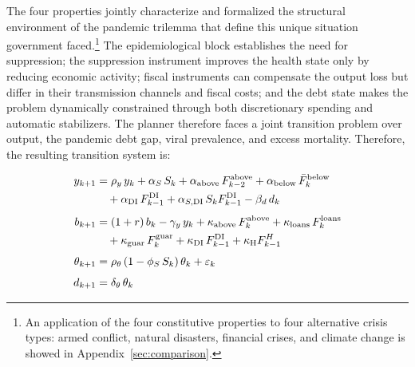 \documentclass[12pt, a4paper]{article}
\begin{document}

\vspace{5mm}
\noindent The four properties jointly characterize and formalized the structural environment of the pandemic trilemma that define this unique situation government faced.\footnote{An application of the four constitutive properties to four alternative crisis types: armed conflict, natural disasters, financial crises, and climate change is showed in Appendix~\ref{sec:comparison}.} The epidemiological block establishes the need for suppression; the suppression instrument improves the health state only by reducing economic activity; fiscal instruments can compensate the output loss but differ in their transmission channels and fiscal costs; and the debt state makes the problem dynamically constrained through both discretionary spending and automatic stabilizers. The planner therefore faces a joint transition problem over output, the pandemic debt gap, viral prevalence, and excess mortality. Therefore, the resulting transition system is:

\begin{align}
  y_{k+1} &= \rho_y\, y_k + \alpha_S\, S_k
          + \alpha_{\text{above}}\, F^{\text{above}}_{k-2}
          + \alpha_{\text{below}}\, \bar F^{\text{below}}_k \notag  \\
          &\quad + \alpha_{\text{DI}}\, F^{\text{DI}}_{k-1}
          + \alpha_{S,\text{DI}}\, S_k F^{\text{DI}}_{k-1}
          - \beta_d\, d_k
          \label{eq:trans_y} \\[4pt]
  b_{k+1} &= (1+r)\, b_k - \gamma_y\, y_k
          + \kappa_{\text{above}}\, F^{\text{above}}_k
          + \kappa_{\text{loans}}\, F^{\text{loans}}_k \notag \\
          &\quad + \kappa_{\text{guar}}\, F^{\text{guar}}_k
          + \kappa_{\text{DI}}\, F^{\text{DI}}_{k-1} +\kappa_{\text{H}}F^H_{k-1}
          \label{eq:trans_b} \\[4pt]
  \theta_{k+1} &= \rho_\theta \left(1 - \phi_S\, S_k\right)\theta_k
          + \varepsilon_k
          \label{eq:trans_theta} \\[4pt]
  d_{k+1} &= \delta_\theta\, \theta_k
          \label{eq:trans_d}
\end{align}
\end{document}
